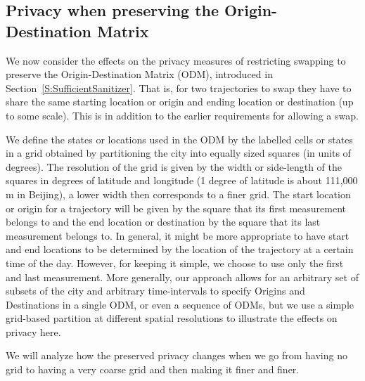 \documentclass[review]{elsarticle}
\begin{document}
\subsection{Privacy when preserving the Origin-Destination Matrix}\label{S:PrivacyODM}
We now consider the effects on the privacy measures of restricting 
swapping to preserve the Origin-Destination Matrix (ODM), introduced in Section~\ref{S:SufficientSanitizer}. That is, for two trajectories to
swap they have to share the same starting location or origin and ending location or destination (up to some scale).  
This is in addition to the earlier requirements for allowing a swap.

We define the states or locations used in the ODM by the labelled cells or states in a grid obtained by partitioning the
city into equally sized squares (in units of degrees).  
The resolution of the grid is given by the width or side-length of the squares in degrees of latitude and
longitude (1 degree of latitude is about 111,000 m in Beijing), a lower width then corresponds to a finer grid. 
The start location or origin for a trajectory will be given by the square that its first
measurement belongs to and the end location or destination by the square that its last
measurement belongs to. In general, it might be more appropriate to
have start and end locations to be determined by the location of the
trajectory at a certain time of the day. However, for keeping it
simple, we choose to use only the first and last measurement.
More generally, our approach allows for an arbitrary set of subsets of the city and arbitrary time-intervals to specify Origins and Destinations in a single ODM, or even a sequence of ODMs, but we use a simple grid-based partition at different spatial resolutions to illustrate the effects on privacy here.  

We will analyze how the preserved privacy changes when we go from having
no grid to having a very coarse grid and then making it finer and
finer.
\end{document}
